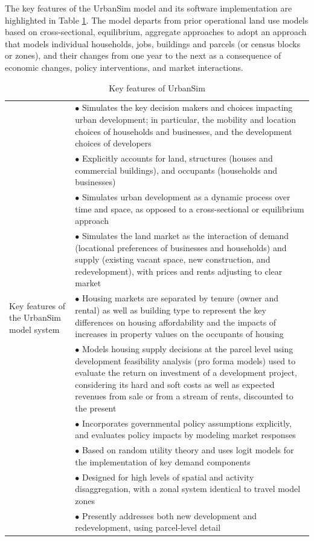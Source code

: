 The key features of the UrbanSim model and its software implementation are highlighted in Table \ref{tab:key-features}. The model departs from prior operational land use models based on cross-sectional, equilibrium, aggregate approaches to adopt an approach that models individual households, jobs, buildings and parcels (or census blocks or zones), and their changes from one year to the next as a consequence of economic changes, policy interventions, and market interactions.

\begin{table}[htbp]
\caption{Key features of UrbanSim}
\label{tab:key-features}
\begin{center}
\begin{tabular}{ p{} p{} }
    \toprule
    
    \multirow[c]{10}{0.2\textwidth}{Key features of the UrbanSim model system}
    & $\bullet$ Simulates the key decision makers and choices impacting urban development; in particular, the mobility and location choices of households and businesses, and the development choices of developers\\
    & $\bullet$ Explicitly accounts for land, structures (houses and commercial buildings), and occupants (households and businesses)\\
    & $\bullet$ Simulates urban development as a dynamic process over time and space, as opposed to a cross-sectional or equilibrium approach\\
    & $\bullet$ Simulates the land market as the interaction of demand (locational preferences of businesses and households) and supply (existing vacant space, new construction, and redevelopment), with prices and rents adjusting to clear market\\
    & $\bullet$ Housing markets are separated by tenure (owner and rental) as well as building type to represent the key differences on housing affordability and the impacts of increases in property values on the occupants of housing\\
    & $\bullet$ Models housing supply decisions at the parcel level using development feasibility analysis (pro forma models) used to evaluate the return on investment of a development project, considering its hard and soft costs as well as expected revenues from sale or from a stream of rents, discounted to the present\\
    & $\bullet$ Incorporates governmental policy assumptions explicitly, and evaluates policy impacts by modeling market responses\\
    & $\bullet$ Based on random utility theory and uses logit models for the implementation of key demand components\\
    & $\bullet$ Designed for high levels of spatial and activity disaggregation, with a zonal system identical to travel model zones\\
    & $\bullet$ Presently addresses both new development and redevelopment, using parcel-level detail\\
    

\end{tabular}
\end{center}
\end{table}
